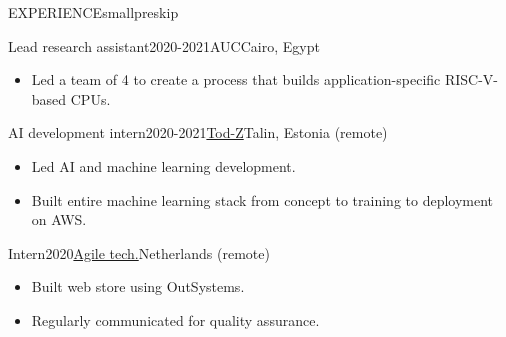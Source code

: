 \documentclass{resume}
\begin{document}
\begin{minipage}[t]{0.45\textwidth}
\begin{rsection}{\MakeUppercase{experience}}{smallpreskip}
		\divider
		\begin{rcontent}{Lead research assistant}{2020-2021}{AUC}{Cairo, Egypt}
			\begin{itemize}
				\item Led a team of 4 to create a process that builds application-specific RISC-V-based CPUs.
			\end{itemize}
		\end{rcontent}
		\divider
		\begin{rcontent}{AI development intern}{2020-2021}{\href{https://www.tod-z.com/}{Tod-Z}}{Talin, Estonia (remote)}
			\begin{itemize}
				\item Led AI and machine learning development.
				\item Built entire machine learning stack from concept to training to deployment on AWS.
			\end{itemize}
		\end{rcontent}
		\divider
		\begin{rcontent}{Intern}{2020}{\href{https://www.agiletz.com/}{Agile tech.}}{Netherlands (remote)}
			\begin{itemize}
				\item Built web store using OutSystems.
				\item Regularly communicated for quality assurance.
			\end{itemize}
		\end{rcontent}

	\end{rsection}


\end{minipage}
\end{document}
